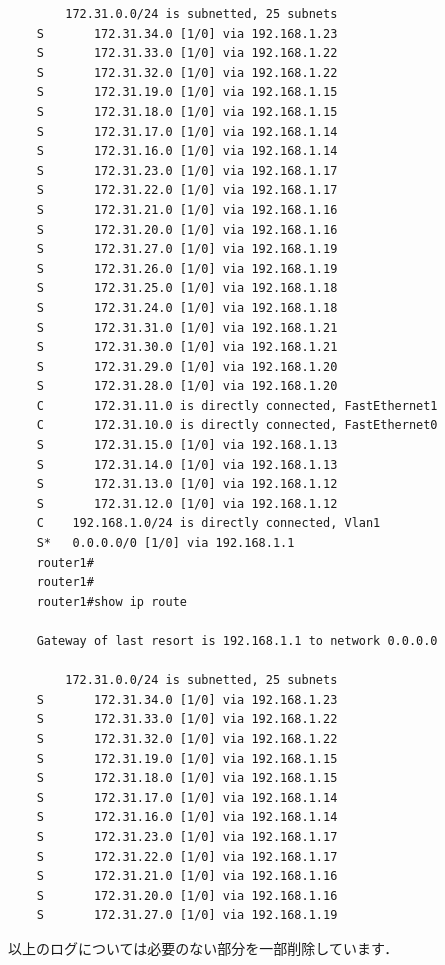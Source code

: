 \documentclass{jlreq}
\begin{document}
\begin{lstlisting}
        172.31.0.0/24 is subnetted, 25 subnets
    S       172.31.34.0 [1/0] via 192.168.1.23
    S       172.31.33.0 [1/0] via 192.168.1.22
    S       172.31.32.0 [1/0] via 192.168.1.22
    S       172.31.19.0 [1/0] via 192.168.1.15
    S       172.31.18.0 [1/0] via 192.168.1.15
    S       172.31.17.0 [1/0] via 192.168.1.14
    S       172.31.16.0 [1/0] via 192.168.1.14
    S       172.31.23.0 [1/0] via 192.168.1.17
    S       172.31.22.0 [1/0] via 192.168.1.17
    S       172.31.21.0 [1/0] via 192.168.1.16
    S       172.31.20.0 [1/0] via 192.168.1.16
    S       172.31.27.0 [1/0] via 192.168.1.19
    S       172.31.26.0 [1/0] via 192.168.1.19
    S       172.31.25.0 [1/0] via 192.168.1.18
    S       172.31.24.0 [1/0] via 192.168.1.18
    S       172.31.31.0 [1/0] via 192.168.1.21
    S       172.31.30.0 [1/0] via 192.168.1.21
    S       172.31.29.0 [1/0] via 192.168.1.20
    S       172.31.28.0 [1/0] via 192.168.1.20
    C       172.31.11.0 is directly connected, FastEthernet1
    C       172.31.10.0 is directly connected, FastEthernet0
    S       172.31.15.0 [1/0] via 192.168.1.13
    S       172.31.14.0 [1/0] via 192.168.1.13
    S       172.31.13.0 [1/0] via 192.168.1.12
    S       172.31.12.0 [1/0] via 192.168.1.12
    C    192.168.1.0/24 is directly connected, Vlan1
    S*   0.0.0.0/0 [1/0] via 192.168.1.1
    router1#
    router1#
    router1#show ip route

    Gateway of last resort is 192.168.1.1 to network 0.0.0.0

        172.31.0.0/24 is subnetted, 25 subnets
    S       172.31.34.0 [1/0] via 192.168.1.23
    S       172.31.33.0 [1/0] via 192.168.1.22
    S       172.31.32.0 [1/0] via 192.168.1.22
    S       172.31.19.0 [1/0] via 192.168.1.15
    S       172.31.18.0 [1/0] via 192.168.1.15
    S       172.31.17.0 [1/0] via 192.168.1.14
    S       172.31.16.0 [1/0] via 192.168.1.14
    S       172.31.23.0 [1/0] via 192.168.1.17
    S       172.31.22.0 [1/0] via 192.168.1.17
    S       172.31.21.0 [1/0] via 192.168.1.16
    S       172.31.20.0 [1/0] via 192.168.1.16
    S       172.31.27.0 [1/0] via 192.168.1.19

  \end{lstlisting}
  以上のログについては必要のない部分を一部削除しています．

  \newpage
\end{document}

